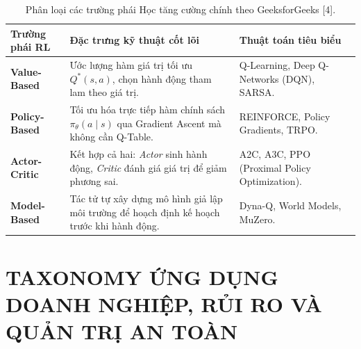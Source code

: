 \documentclass[12pt,a4paper]{article}
\begin{document}
\begin{table}[H]
\centering
\caption{Phân loại các trường phái Học tăng cường chính theo GeeksforGeeks [4].}
\label{tab:rl_taxonomy}
\small
\begin{tabularx}{\textwidth}{@{} l X X @{}}
\toprule
\textbf{Trường phái RL} & \textbf{Đặc trưng kỹ thuật cốt lõi} & \textbf{Thuật toán tiêu biểu} \\
\midrule
\textbf{Value-Based} & Ước lượng hàm giá trị tối ưu $Q^*(s,a)$, chọn hành động tham lam theo giá trị. & Q-Learning, Deep Q-Networks (DQN), SARSA. \\
\addlinespace[2pt]
\textbf{Policy-Based} & Tối ưu hóa trực tiếp hàm chính sách $\pi_\theta(a \mid s)$ qua Gradient Ascent mà không cần Q-Table. & REINFORCE, Policy Gradients, TRPO. \\
\addlinespace[2pt]
\textbf{Actor-Critic} & Kết hợp cả hai: \textit{Actor} sinh hành động, \textit{Critic} đánh giá giá trị để giảm phương sai. & A2C, A3C, PPO (Proximal Policy Optimization). \\
\addlinespace[2pt]
\textbf{Model-Based} & Tác tử tự xây dựng mô hình giả lập môi trường để hoạch định kế hoạch trước khi hành động. & Dyna-Q, World Models, MuZero. \\
\bottomrule
\end{tabularx}
\end{table}

\clearpage


\section{TAXONOMY ỨNG DỤNG DOANH NGHIỆP, RỦI RO VÀ QUẢN TRỊ AN TOÀN}
\end{document}
